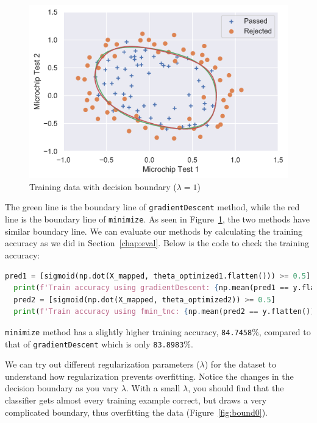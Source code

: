 \documentclass[12pt]{article}
\begin{document}
\begin{figure}[h!]
  \centering
  \includegraphics[scale=0.6]{bound003.png}
  \caption{Training data with decision boundary ($\lambda = 1$)}
  \label{fig:bound003}
\end{figure}

The green line is the boundary line of \texttt{gradientDescent} method, while the red line is the boundary line of \texttt{minimize}. As seen in Figure~\ref{fig:bound003}, the two methods have similar boundary line. We can evaluate our methods by calculating the training accuracy as we did in Section~\ref{chap:eval}. Below is the code to check the training accuracy:

\begin{lstlisting}[language=Python]
  pred1 = [sigmoid(np.dot(X_mapped, theta_optimized1.flatten())) >= 0.5]
  print(f'Train accuracy using gradientDescent: {np.mean(pred1 == y.flatten()) * 100:.4f}%')
  pred2 = [sigmoid(np.dot(X_mapped, theta_optimized2)) >= 0.5]
  print(f'Train accuracy using fmin_tnc: {np.mean(pred2 == y.flatten()) * 100:.4f}%')
\end{lstlisting}

\texttt{minimize} method has a slightly higher training accuracy, \texttt{84.7458}\%, compared to that of \texttt{gradientDescent} which is only \texttt{83.8983}\%.

We can try out different regularization parameters ($\lambda$) for the dataset to understand how regularization prevents overfitting. Notice the changes in the decision boundary as you vary $\lambda$. With a small $\lambda$, you should find that the classifier gets almost every training example correct, but draws a very complicated boundary, thus overfitting the data (Figure~\ref{fig:bound0}). 
\end{document}
